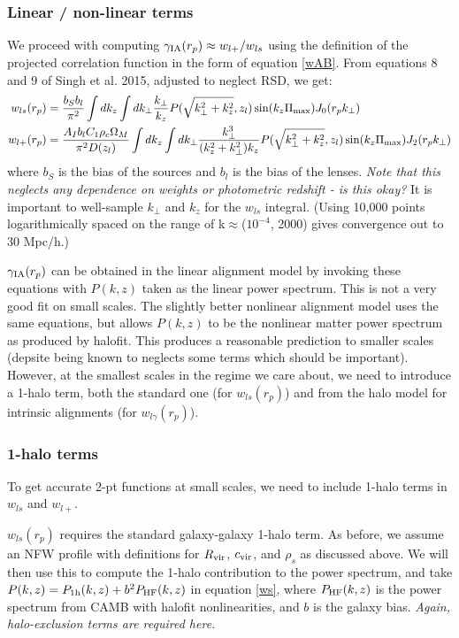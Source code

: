 \documentclass[onecolumn,amsmath,aps,fleqn, superscriptaddress]{revtex4}
\begin{document}
\subsubsection*{Linear / non-linear terms}
We proceed with computing $\gamma_{\rm IA}(r_p) \approx w_{l+} / w_{ls}$ using the definition of the projected correlation function in the form of equation \ref{wAB}. From equations 8 and 9 of Singh et al. 2015, adjusted to neglect RSD, we get:
\begin{align}
w_{ls}(r_p) &= \frac{b_S b_l}{\pi^2} \int dk_z  \int dk_\perp  \frac{k_\perp}{k_z} P(\sqrt{k_\perp^2 + k_z^2}, z_l) \sin(k_z \Pi_{\rm max}) J_0(r_p k_\perp) \nonumber \\
w_{l+}(r_p) &= \frac{A_I b_l C_1 \rho_c \Omega_M}{\pi^2 D(z_l)} \int dk_z  \int dk_\perp  \frac{k_\perp^3 }{(k_z^2 + k_\perp^2)k_z} P(\sqrt{k_\perp^2 + k_z^2}, z_l) \sin(k_z \Pi_{\rm max}) J_2(r_p k_\perp)
\label{ws}
\end{align}
where $b_S$ is the bias of the sources and $b_l$ is the bias of the lenses. {\it Note that this neglects any dependence on weights or photometric redshift - is this okay?} It is important to well-sample $k_\perp$ and $k_z$ for the $w_{ls}$ integral. (Using 10,000 points logarithmically spaced on the range of k$\approx$($10^{-4}$, 2000) gives convergence out to $30$ Mpc/h.)

$\gamma_{\rm IA}(r_p)$ can be obtained in the linear alignment model by invoking these equations with $P(k,z)$ taken as the linear power spectrum. This is not a very good fit on small scales. The slightly better nonlinear alignment model uses the same equations, but allows $P(k,z)$ to be the nonlinear matter power spectrum as produced by halofit. This produces a reasonable prediction to smaller scales (depsite being known to neglects some terms which should be important). However, at the smallest scales in the regime we care about, we need to introduce a 1-halo term, both the standard one (for $w_{ls}(r_p)$) and from the halo model for intrinsic alignments (for $w_{l\gamma}(r_p)$). 

\subsubsection*{1-halo terms}
To get accurate 2-pt functions at small scales, we need to include 1-halo terms in $w_{ls}$ and $w_{l+}$. 

$w_{ls}(r_p)$ requires the standard galaxy-galaxy 1-halo term. As before, we assume an NFW profile with definitions for $R_{\rm vir}$, $c_{\rm vir}$, and $\rho_s$ as discussed above. We will then use this to compute the 1-halo contribution to the power spectrum, and take $P(k,z) = P_{\rm 1h}(k,z) + b^2P_{\rm HF}(k,z)$ in equation \ref{ws}, where $P_{\rm HF}(k,z)$ is the power spectrum from CAMB with halofit nonlinearities, and $b$ is the galaxy bias. {\it Again, halo-exclusion terms are required here.} 
\end{document}
